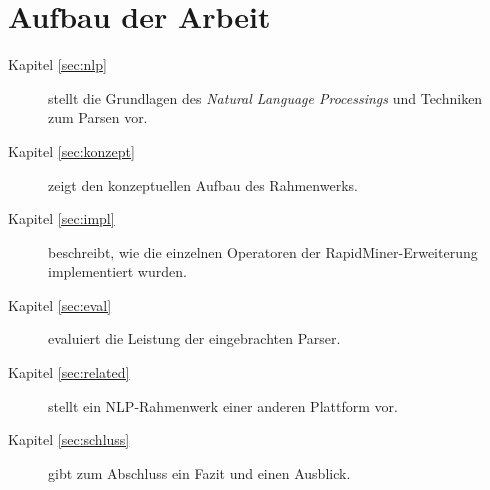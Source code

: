 \section{Aufbau der Arbeit}
\begin{description}
\item[Kapitel \ref{sec:nlp}] stellt die Grundlagen des \textit{Natural Language Processings} und Techniken zum Parsen vor.
\item[Kapitel \ref{sec:konzept}] zeigt den konzeptuellen Aufbau des Rahmenwerks.
\item[Kapitel \ref{sec:impl}] beschreibt, wie die einzelnen Operatoren der RapidMiner-Erweiterung implementiert wurden.
\item[Kapitel \ref{sec:eval}] evaluiert die Leistung der eingebrachten Parser.
\item[Kapitel \ref{sec:related}] stellt ein NLP-Rahmenwerk einer anderen Plattform vor.
\item[Kapitel \ref{sec:schluss}] gibt zum Abschluss ein Fazit und einen Ausblick.
\end{description}